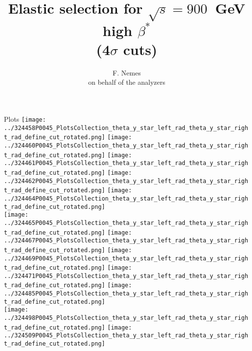 \documentclass{beamer}
\title[TOTEM Physics Analysis meeting, 900 GeV high-$\beta^{*}$ for CNI analysis]{\scriptsize Elastic selection for $\sqrt{s}=900$~GeV high $\beta^{*}$\\ (4$\sigma$ cuts)}
\author{F. Nemes\\\vspace{1mm} \tiny on behalf of the analyzers}
\begin{document}
\begin{frame}
        \titlepage
\end{frame}

\begin{frame}\tiny
        \begin{block}{Plots}
		  \centering
                \texttt{[image: ../324458P0045\_PlotsCollection\_theta\_y\_star\_left\_rad\_theta\_y\_star\_right\_rad\_define\_cut\_rotated.png]}
                \texttt{[image: ../324460P0045\_PlotsCollection\_theta\_y\_star\_left\_rad\_theta\_y\_star\_right\_rad\_define\_cut\_rotated.png]}
                \texttt{[image: ../324461P0045\_PlotsCollection\_theta\_y\_star\_left\_rad\_theta\_y\_star\_right\_rad\_define\_cut\_rotated.png]}
                \texttt{[image: ../324462P0045\_PlotsCollection\_theta\_y\_star\_left\_rad\_theta\_y\_star\_right\_rad\_define\_cut\_rotated.png]}
                \texttt{[image: ../324464P0045\_PlotsCollection\_theta\_y\_star\_left\_rad\_theta\_y\_star\_right\_rad\_define\_cut\_rotated.png]}\\
                \texttt{[image: ../324465P0045\_PlotsCollection\_theta\_y\_star\_left\_rad\_theta\_y\_star\_right\_rad\_define\_cut\_rotated.png]}
                \texttt{[image: ../324467P0045\_PlotsCollection\_theta\_y\_star\_left\_rad\_theta\_y\_star\_right\_rad\_define\_cut\_rotated.png]}
                \texttt{[image: ../324469P0045\_PlotsCollection\_theta\_y\_star\_left\_rad\_theta\_y\_star\_right\_rad\_define\_cut\_rotated.png]}
                \texttt{[image: ../324471P0045\_PlotsCollection\_theta\_y\_star\_left\_rad\_theta\_y\_star\_right\_rad\_define\_cut\_rotated.png]}
                \texttt{[image: ../324485P0045\_PlotsCollection\_theta\_y\_star\_left\_rad\_theta\_y\_star\_right\_rad\_define\_cut\_rotated.png]}\\
                \texttt{[image: ../324498P0045\_PlotsCollection\_theta\_y\_star\_left\_rad\_theta\_y\_star\_right\_rad\_define\_cut\_rotated.png]}
                \texttt{[image: ../324509P0045\_PlotsCollection\_theta\_y\_star\_left\_rad\_theta\_y\_star\_right\_rad\_define\_cut\_rotated.png]}

\end{block}
\end{frame}
\end{document}
